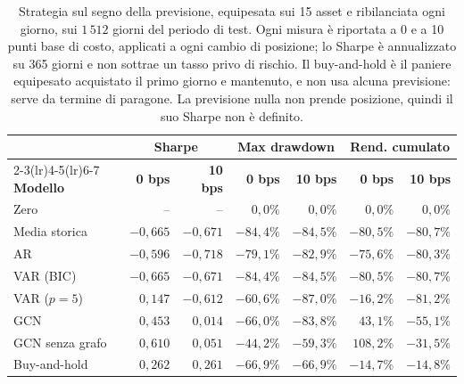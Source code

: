 \begin{table}[H]
\centering
\caption[Metriche economiche della strategia sul segno]{Strategia sul segno della previsione, equipesata sui 15 asset e ribilanciata ogni giorno, sui $1\,512$ giorni del periodo di test. Ogni misura è riportata a 0 e a 10 punti base di costo, applicati a ogni cambio di posizione; lo Sharpe è annualizzato su 365 giorni e non sottrae un tasso privo di rischio. Il buy-and-hold è il paniere equipesato acquistato il primo giorno e mantenuto, e non usa alcuna previsione: serve da termine di paragone. La previsione nulla non prende posizione, quindi il suo Sharpe non è definito.}
\label{tab:backtest}
\small
\begin{tabular}{@{}lrrrrrr@{}}
\toprule
 & \multicolumn{2}{c}{\textbf{Sharpe}} & \multicolumn{2}{c}{\textbf{Max drawdown}} & \multicolumn{2}{c}{\textbf{Rend. cumulato}} \\
\cmidrule(lr){2-3}\cmidrule(lr){4-5}\cmidrule(lr){6-7}
\textbf{Modello} & \textbf{0 bps} & \textbf{10 bps} & \textbf{0 bps} & \textbf{10 bps} & \textbf{0 bps} & \textbf{10 bps} \\
\midrule
Zero & -- & -- & $0{,}0\%$ & $0{,}0\%$ & $0{,}0\%$ & $0{,}0\%$ \\
Media storica & $-0{,}665$ & $-0{,}671$ & $-84{,}4\%$ & $-84{,}5\%$ & $-80{,}5\%$ & $-80{,}7\%$ \\
AR & $-0{,}596$ & $-0{,}718$ & $-79{,}1\%$ & $-82{,}9\%$ & $-75{,}6\%$ & $-80{,}3\%$ \\
VAR (BIC) & $-0{,}665$ & $-0{,}671$ & $-84{,}4\%$ & $-84{,}5\%$ & $-80{,}5\%$ & $-80{,}7\%$ \\
VAR ($p=5$) & $0{,}147$ & $-0{,}612$ & $-60{,}6\%$ & $-87{,}0\%$ & $-16{,}2\%$ & $-81{,}2\%$ \\
GCN & $0{,}453$ & $0{,}014$ & $-66{,}0\%$ & $-83{,}8\%$ & $43{,}1\%$ & $-55{,}1\%$ \\
GCN senza grafo & $0{,}610$ & $0{,}051$ & $-44{,}2\%$ & $-59{,}3\%$ & $108{,}2\%$ & $-31{,}5\%$ \\
Buy-and-hold & $0{,}262$ & $0{,}261$ & $-66{,}9\%$ & $-66{,}9\%$ & $-14{,}7\%$ & $-14{,}8\%$ \\
\bottomrule
\end{tabular}
\end{table}
